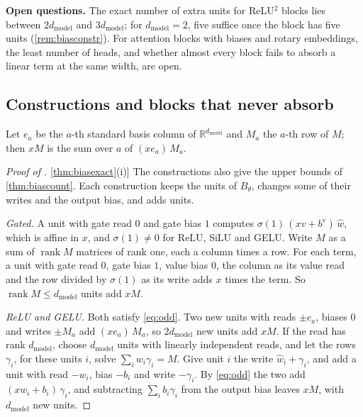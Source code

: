 \documentclass[10pt]{article}
\theoremstyle{definition}
\theoremstyle{remark}
\newcommand{\R}{\mathbb{R}}
\newcommand{\dm}{d_{\mathrm{model}}}
\newcommand{\para}[1]{\smallskip\noindent\textbf{#1}\hspace{0.5em}}
\DeclareRobustCommand{\cpref}[2]{\hyperref[#1:#2]{\cref*{#1}(#2)}}
\begin{document}
\para{Open questions.} The exact number of extra units for ReLU$^2$ blocks lies between $2\dm$ and $3\dm$; for $\dm = 2$, five suffice once the block has five units (\cref{rem:biasconstr}). For attention blocks with biases and rotary embeddings, the least number of heads, and whether almost every block fails to absorb a linear term at the same width, are open.

\subsection{Constructions and blocks that never absorb}

Let $e_a$ be the $a$-th standard basis column of $\R^{\dm}$ and $M_a$ the $a$-th row of $M$; then $xM$ is the sum over $a$ of $(xe_a)\,M_a$.

\begin{proof}[Proof of \cpref{thm:biasexact}{i}]
The constructions also give the upper bounds of \cref{thm:biascount}. Each construction keeps the units of $B_\theta$, changes some of their writes and the output bias, and adds units.

\emph{Gated.} A unit with gate read $0$ and gate bias $1$ computes $\sigma(1)\,(xv + b^{\mathrm v})\,\hat w$, which is affine in $x$, and $\sigma(1) \neq 0$ for ReLU, SiLU and GELU. Write $M$ as a sum of $\operatorname{rank}M$ matrices of rank one, each a column times a row. For each term, a unit with gate read $0$, gate bias $1$, value bias $0$, the column as its value read and the row divided by $\sigma(1)$ as its write adds $x$ times the term. So $\operatorname{rank}M \le \dm$ units add $xM$.

\emph{ReLU and GELU.} Both satisfy \eqref{eq:odd}. Two new units with reads $\pm e_a$, biases $0$ and writes $\pm M_a$ add $(xe_a)\,M_a$, so $2\dm$ new units add $xM$. If the read has rank $\dm$, choose $\dm$ units with linearly independent reads, and let the rows $\gamma_i$, for these units $i$, solve $\sum_i w_i\gamma_i = M$. Give unit $i$ the write $\hat w_i + \gamma_i$, and add a unit with read $-w_i$, bias $-b_i$ and write $-\gamma_i$. By \eqref{eq:odd} the two add $(xw_i + b_i)\,\gamma_i$, and subtracting $\sum_i b_i\gamma_i$ from the output bias leaves $xM$, with $\dm$ new units.


\end{proof}
\end{document}

